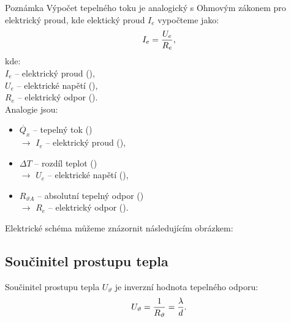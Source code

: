 \documentclass{article}
\begin{document}
\begin{notebox}{Poznámka}
    Výpočet tepelného toku je analogický s Ohmovým zákonem pro elektrický proud, kde elektický proud $I_e$ vypočteme jako:
    \begin{equation}
        I_e = \frac{U_e}{R_e},
        \unit{(\ueqA)}
    \end{equation}
    kde:\\
    $I_e$ -- elektrický proud (\ueqA),\\
    $U_e$ -- elektrické napětí (\ueqV),\\
    $R_e$ -- elektrický odpor (\ueqOHM).\\

    Analogie jsou:
    \begin{itemize}
        \item $\dot{Q_x}$ -- tepelný tok (\ueqW)\\ $\rightarrow$ $I_e$ -- elektrický proud (\ueqA),
        \item $\Delta T$ -- rozdíl teplot (\ueqK)\\ $\rightarrow$ $U_e$ -- elektrické napětí (\ueqV),
        \item $R_{\vartheta A}$ -- absolutní tepelný odpor (\ueqKandWinv)\\ $\rightarrow$ $R_e$ -- elektrický odpor (\ueqOHM).
    \end{itemize}

    Elektrické schéma můžeme znázornit následujícím obrázkem:

    \begin{center}
    \end{center}
\end{notebox}



\subsection{Součinitel prostupu tepla}
Součinitel prostupu tepla $U_\vartheta$ je inverzní hodnota tepelného odporu:
\begin{equation}
    U_\vartheta = \frac{1}{R_{\vartheta}} = \frac{\lambda}{d}.
    \unit{(\ueqWandMinvsqKinv)}
\end{equation}
\end{document}
